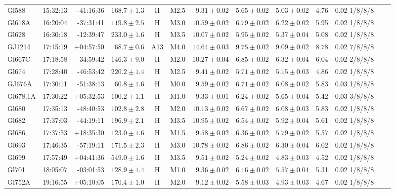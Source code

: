 \documentclass{aa}
\begin{document}
\begin{table}[h!]
{\begin{tabular}{ l r r r c c r r r r r r r}
Gl588 & 15:32:13 & -41:16:36 & $168.7 \pm  1.3$ & H & M2.5 &  $9.31 \pm 0.02$ & $5.65 \pm 0.02$ & $5.03 \pm 0.02$ & 4.76 & 0.02 1/8/8/8 \\
Gl618A & 16:20:04 & -37:31:41 & $119.8 \pm  2.5$ & H & M3.0 &  $10.59 \pm 0.02$ & $6.79 \pm 0.02$ & $6.22 \pm 0.02$ & 5.95 & 0.02 1/8/8/8 \\
Gl628 & 16:30:18 & -12:39:47 & $233.0 \pm  1.6$ & H & M3.5 &  $10.07 \pm 0.02$ & $5.95 \pm 0.02$ & $5.37 \pm 0.04$ & 5.08 & 0.02 1/8/8/8 \\
GJ1214 & 17:15:19 & +04:57:50 & $68.7 \pm  0.6$ & A13 & M4.0 &  $14.64 \pm 0.03$ & $9.75 \pm 0.02$ & $9.09 \pm 0.02$ & 8.78 & 0.02 7/8/8/8 \\
Gl667C & 17:18:58 & -34:59:42 & $146.3 \pm  9.0$ & H & M2.0 &  $10.27 \pm 0.04$ & $6.85 \pm 0.02$ & $6.32 \pm 0.04$ & 6.04 & 0.02 2/8/8/8 \\
Gl674 & 17:28:40 & -46:53:42 & $220.2 \pm  1.4$ & H & M2.5 &  $9.41 \pm 0.02$ & $5.71 \pm 0.02$ & $5.15 \pm 0.03$ & 4.86 & 0.02 1/8/8/8 \\
GJ676A & 17:30:11 & -51:38:13 & $60.8 \pm  1.6$ & H & M0.0 &  $9.59 \pm 0.02$ & $6.71 \pm 0.02$ & $6.08 \pm 0.02$ & 5.83 & 0.03 1/8/8/8 \\
Gl678.1A & 17:30:22 & +05:32:53 & $100.2 \pm  1.1$ & H & M1.0 &  $9.33 \pm 0.01$ & $6.24 \pm 0.02$ & $5.65 \pm 0.04$ & 5.42 & 0.03 3/8/8/8 \\
Gl680 & 17:35:13 & -48:40:53 & $102.8 \pm  2.8$ & H & M2.0 &  $10.13 \pm 0.02$ & $6.67 \pm 0.02$ & $6.08 \pm 0.03$ & 5.83 & 0.02 1/8/8/8 \\
Gl682 & 17:37:03 & -44:19:11 & $196.9 \pm  2.1$ & H & M3.5 &  $10.95 \pm 0.02$ & $6.54 \pm 0.02$ & $5.92 \pm 0.04$ & 5.61 & 0.02 1/8/8/8 \\
Gl686 & 17:37:53 & +18:35:30 & $123.0 \pm  1.6$ & H & M1.5 &  $9.58 \pm 0.02$ & $6.36 \pm 0.02$ & $5.79 \pm 0.02$ & 5.57 & 0.02 1/8/8/8 \\
Gl693 & 17:46:35 & -57:19:11 & $171.5 \pm  2.3$ & H & M3.0 &  $10.78 \pm 0.02$ & $6.86 \pm 0.02$ & $6.30 \pm 0.04$ & 6.02 & 0.02 1/8/8/8 \\
Gl699 & 17:57:49 & +04:41:36 & $549.0 \pm  1.6$ & H & M3.5 &  $9.51 \pm 0.02$ & $5.24 \pm 0.02$ & $4.83 \pm 0.03$ & 4.52 & 0.02 1/8/8/8 \\
Gl701 & 18:05:07 & -03:01:53 & $128.9 \pm  1.4$ & H & M1.0 &  $9.36 \pm 0.02$ & $6.16 \pm 0.02$ & $5.57 \pm 0.04$ & 5.31 & 0.02 1/8/8/8 \\
Gl752A & 19:16:55 & +05:10:05 & $170.4 \pm  1.0$ & H & M2.0 &  $9.12 \pm 0.02$ & $5.58 \pm 0.03$ & $4.93 \pm 0.03$ & 4.67 & 0.02 1/8/8/8 \\

\end{tabular}}
\end{table}
\end{document}
